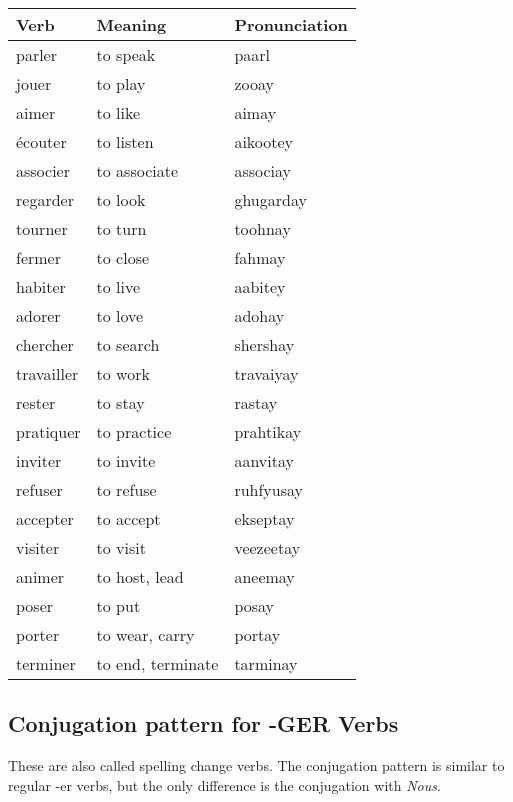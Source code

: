 \begin{longtable}{| l | l | l |}
\hline
Verb 		& Meaning 		& Pronunciation	\\
\hline
\endhead
parler		& to speak		& paarl			\\ 	\hline
jouer		& to play		& zooay			\\	\hline
aimer		& to like		& aimay			\\	\hline
\'ecouter	& to listen		& aikootey		\\	\hline
associer	& to associate	& associay		\\	\hline
regarder	& to look		& ghugarday		\\	\hline
tourner		& to turn		& toohnay		\\	\hline
fermer		& to close		& fahmay		\\	\hline
habiter		& to live		& aabitey		\\	\hline
adorer 		& to love		& adohay		\\	\hline
chercher	& to search		& shershay		\\	\hline
travailler	& to work		& travaiyay		\\	\hline
rester      & to stay       & rastay        \\  \hline
pratiquer   & to practice   & prahtikay     \\  \hline
inviter     & to invite     & aanvitay      \\  \hline
refuser     & to refuse     & ruhfyusay     \\  \hline
accepter    & to accept     & ekseptay      \\  \hline
visiter     & to visit      & veezeetay     \\  \hline
animer      & to host, lead & aneemay       \\  \hline
poser       & to put        & posay         \\  \hline
porter      & to wear, carry& portay        \\  \hline
terminer    & to end, terminate & tarminay  \\  \hline
\end{longtable}

\subsection{Conjugation pattern for -GER Verbs}
These are also called spelling change verbs. The conjugation pattern is
similar to regular -er verbs, but the only difference is the conjugation
with \emph{Nous}.

